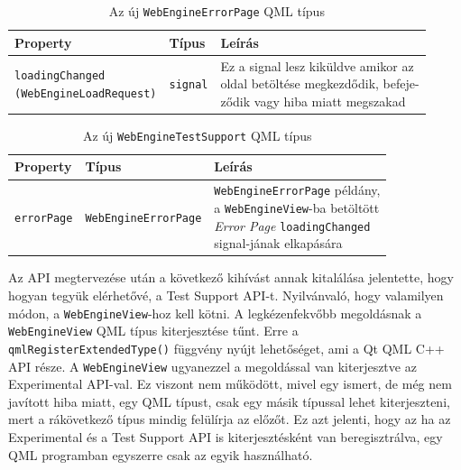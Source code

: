 \documentclass[12pt]{report}
\begin{document}
\begin{table}[h!]
    \centering
    \begin{tabular}{ | l | l | p{185pt} | }
        \hline
        \textbf{Property} & \textbf{Típus} & \textbf{Leírás} \\ \hline

        \makecell[l]{\texttt{loadingChanged} \\ \texttt{(WebEngineLoadRequest)}} &
        \texttt{signal} &
        \makecell[l]{
        Ez a signal lesz kiküldve amikor az \\
        oldal betöltése megkezdődik, befeje-\\
        ződik vagy hiba miatt megszakad}
        \\ \hline
    \end{tabular}
    \caption{
        \label{tab:test-support-webengine-errorpage}
        Az új \texttt{WebEngineErrorPage} QML típus
    }
\end{table}

\begin{table}[h!]
    \centering
    \begin{tabular}{ | l | l | p{195pt} | }
        \hline
        \textbf{Property} & \textbf{Típus} & \textbf{Leírás} \\ \hline

        \texttt{errorPage} & \texttt{WebEngineErrorPage} &
        \makecell[l]{
            \texttt{WebEngineErrorPage} példány, \\
            a \texttt{WebEngineView}-ba betöltött \\
            \textit{Error Page} \texttt{loadingChanged} \\
            signal-jának elkapására}
        \\ \hline
    \end{tabular}
    \caption{
        \label{tab:test-support-webengine-testsupport}
        Az új \texttt{WebEngineTestSupport} QML típus
    }
\end{table}

Az API megtervezése után a következő kihívást annak kitalálása jelentette, hogy
hogyan tegyük elérhetővé, a Test Support API-t. Nyilvánvaló, hogy valamilyen módon,
a \texttt{WebEngineView}-hoz kell kötni. A legkézenfekvőbb megoldásnak a \\
\texttt{WebEngineView} QML típus kiterjesztése tűnt. Erre a \\
\texttt{qmlRegisterExtendedType()} függvény nyújt lehetőséget, ami a Qt QML C++ API része.
A \texttt{WebEngineView} ugyanezzel a megoldással van kiterjesztve az Experimental
API-val. Ez viszont nem működött, mivel egy ismert, de még nem javított hiba miatt,
egy QML típust, csak egy másik típussal lehet kiterjeszteni, mert a rákövetkező típus mindig
felülírja az előzőt. Ez azt jelenti, hogy az ha az Experimental és a Test Support API is
kiterjesztésként van beregisztrálva, egy QML programban egyszerre csak az egyik
használható.
\end{document}
